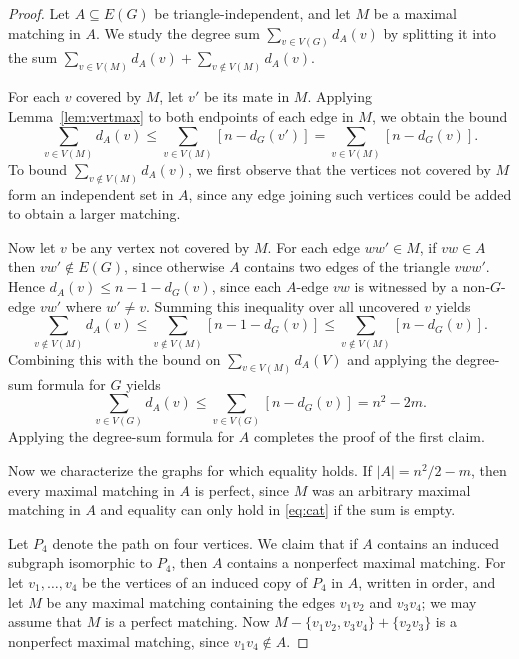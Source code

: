 \documentclass{amsart}
\renewcommand{\subset}{\subseteq}
\newcommand{\lfrac}[2]{#1/#2}
\newcommand{\sizeof}[1]{\left\lvert{#1}\right\rvert}
\theoremstyle{definition}
\theoremstyle{remark}
\begin{document}
\begin{proof}
  Let $A \subset E(G)$ be triangle-independent, and let $M$ be a
  maximal matching in $A$.  We study the degree sum $\sum_{v \in
    V(G)}d_A(v)$ by splitting it into the sum $\sum_{v \in V(M)}d_A(v)
  + \sum_{v \notin V(M)}d_A(v)$.

  For each $v$ covered by $M$, let $v'$ be its mate in $M$.  Applying
  Lemma~\ref{lem:vertmax} to both endpoints of each edge in $M$, we
  obtain the bound
  \[
    \sum_{v \in V(M)}d_A(v) \leq \sum_{v \in V(M)}[n - d_G(v')] = \sum_{v \in V(M)}[n - d_G(v)].
    \]
  To bound $\sum_{v \notin V(M)}d_A(v)$, we first observe that the vertices not
  covered by $M$ form an independent set in $A$, since any edge
  joining such vertices could be added to obtain a larger matching.

  Now let $v$ be any vertex not covered by $M$.  For each edge $ww'
  \in M$, if $vw \in A$ then $vw' \notin E(G)$, since otherwise $A$
  contains two edges of the triangle $vww'$. Hence $d_A(v) \leq n - 1 -
  d_G(v)$, since each $A$-edge $vw$ is witnessed by a non-$G$-edge $vw'$ where $w' \neq v$.
  Summing this inequality over all uncovered $v$ yields
  \begin{equation}
    \label{eq:cat}
    \sum_{v \notin V(M)}d_A(v) \leq \sum_{v \notin V(M)}[n - 1 - d_G(v)] \leq \sum_{v \notin V(M)}[n - d_G(v)].
  \end{equation}
  Combining this with the bound on $\sum_{v \in V(M)}d_A(V)$ and applying the degree-sum formula for $G$ yields
  \[ \sum_{v \in V(G)}d_A(v) \leq \sum_{v \in V(G)}[n - d_G(v)] = n^2 - 2m. \]
  Applying the degree-sum formula for $A$ completes the proof of the first claim.
  \medskip

  Now we characterize the graphs for which equality holds.  If
  $\sizeof{A} = \lfrac{n^2}{2} - m$, then every maximal matching in $A$
  is perfect, since $M$ was an arbitrary maximal matching in $A$ and
  equality can only hold in \eqref{eq:cat} if the sum is empty.

  Let $P_4$ denote the path on four vertices. We claim that if $A$
  contains an induced subgraph isomorphic to $P_4$, then $A$ contains a
  nonperfect maximal matching. For let $v_1,\ldots,v_4$ be the
  vertices of an induced copy of $P_4$ in $A$, written in order, and
  let $M$ be any maximal matching containing the edges $v_1v_2$ and
  $v_3v_4$; we may assume that $M$ is a perfect matching. Now $M -
  \{v_1v_2,v_3v_4\} + \{v_2v_3\}$ is a nonperfect maximal matching,
  since $v_1v_4 \notin A$.


\end{proof}
\end{document}
